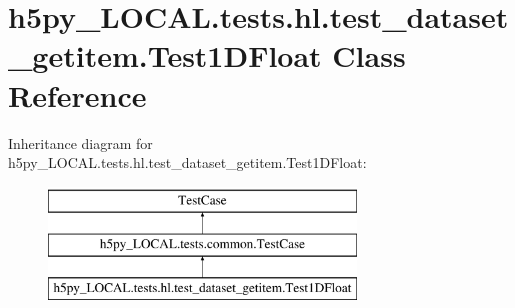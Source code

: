 \hypertarget{classh5py__LOCAL_1_1tests_1_1hl_1_1test__dataset__getitem_1_1Test1DFloat}{}\section{h5py\+\_\+\+L\+O\+C\+A\+L.\+tests.\+hl.\+test\+\_\+dataset\+\_\+getitem.\+Test1\+D\+Float Class Reference}
\label{classh5py__LOCAL_1_1tests_1_1hl_1_1test__dataset__getitem_1_1Test1DFloat}
Inheritance diagram for h5py\+\_\+\+L\+O\+C\+A\+L.\+tests.\+hl.\+test\+\_\+dataset\+\_\+getitem.\+Test1\+D\+Float\+:\begin{figure}[H]
\begin{center}
\leavevmode
\includegraphics[height=3.000000cm]{classh5py__LOCAL_1_1tests_1_1hl_1_1test__dataset__getitem_1_1Test1DFloat}
\end{center}
\end{figure}
